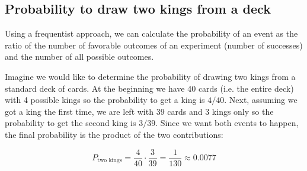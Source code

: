 \subsection{Probability to draw two kings from a deck}
Using a frequentist approach, we can calculate the
probability of an event as the ratio of the number of favorable outcomes
of an experiment (number of successes) and the number of all possible
outcomes. 

Imagine we would like to determine the probability of drawing two kings from a standard deck of cards.
At the beginning we have 40 cards (i.e. the entire deck) with 4 possible kings so the probability to get a king is $4/40$. Next, assuming we got a king the first time, we are left with 39 cards and 3 kings only so the probability to get the second king is $3/39$. Since we want both events to happen, the final probability is the product of the two contributions:

\begin{equation*}
P_\textrm{two kings} = \frac{4}{40} \cdot \frac{3}{39} = \frac{1}{130} \approx 0.0077
\end{equation*}

